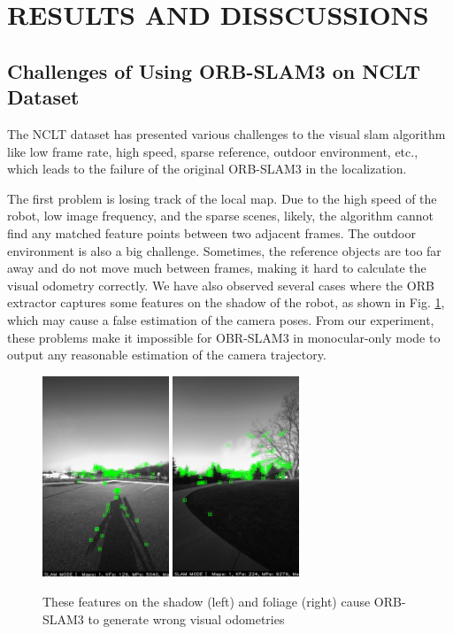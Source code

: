 \documentclass[letterpaper, 10 pt, conference]{ieeeconf}  %
\begin{document}
\section{RESULTS AND DISSCUSSIONS}

\subsection{Challenges of Using ORB-SLAM3 on NCLT Dataset}
The NCLT dataset has presented various challenges to the visual slam algorithm like low frame rate, high speed, sparse reference, outdoor environment, etc., which leads to the failure of the original ORB-SLAM3 in the localization.

The first problem is losing track of the local map. Due to the high speed of the robot, low image frequency, and the sparse scenes, likely, the algorithm cannot find any matched feature points between 
two adjacent frames. The outdoor environment is also a big challenge. Sometimes, the reference objects are too far away and do not move much between frames, making it hard to calculate the visual odometry correctly. We have also observed several cases where the ORB extractor captures some features on the shadow of the robot, as shown in Fig. \ref{fig_feature_on_shadow}, which may cause a false estimation of the camera poses. From our experiment, these problems make it impossible for OBR-SLAM3 in monocular-only mode to output any reasonable estimation of the camera trajectory. 

\begin{figure}[h]
\centering
\includegraphics[height=6cm]{feature_on_shadow.png}
\includegraphics[height=6cm]{foliage.png}
\caption{These features on the shadow (left) and foliage (right) cause ORB-SLAM3 to generate wrong visual odometries}
\label{fig_feature_on_shadow}
\end{figure}
\end{document}
